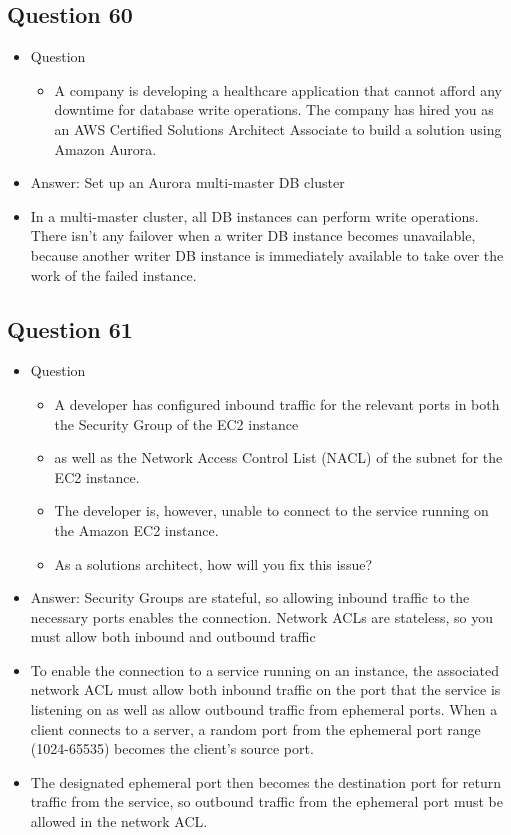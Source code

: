 \documentclass[]{scrartcl}
\begin{document}
\subsection{Question 60}
\begin{itemize}
	\item Question
	\begin{itemize}
		\item A company is developing a healthcare application that cannot afford any downtime for database write operations. The company has hired you as an AWS Certified Solutions Architect Associate to build a solution using Amazon Aurora.
	\end{itemize}
	\item Answer: Set up an Aurora multi-master DB cluster
	\item In a multi-master cluster, all DB instances can perform write operations. There isn't any failover when a writer DB instance becomes unavailable, because another writer DB instance is immediately available to take over the work of the failed instance. 
\end{itemize}

\subsection{Question 61}
\begin{itemize}
	\item Question
	\begin{itemize}
		\item A developer has configured inbound traffic for the relevant ports in both the Security Group of the EC2 instance 
		\item as well as the Network Access Control List (NACL) of the subnet for the EC2 instance. 
		\item The developer is, however, unable to connect to the service running on the Amazon EC2 instance.
		\item As a solutions architect, how will you fix this issue?
	\end{itemize}
	\item Answer: Security Groups are stateful, so allowing inbound traffic to the necessary ports enables the connection. Network ACLs are stateless, so you must allow both inbound and outbound traffic
	\item To enable the connection to a service running on an instance, the associated network ACL must allow both inbound traffic on the port that the service is listening on as well as allow outbound traffic from ephemeral ports. When a client connects to a server, a random port from the ephemeral port range (1024-65535) becomes the client's source port.
	\item The designated ephemeral port then becomes the destination port for return traffic from the service, so outbound traffic from the ephemeral port must be allowed in the network ACL.
\end{itemize}
\end{document}
